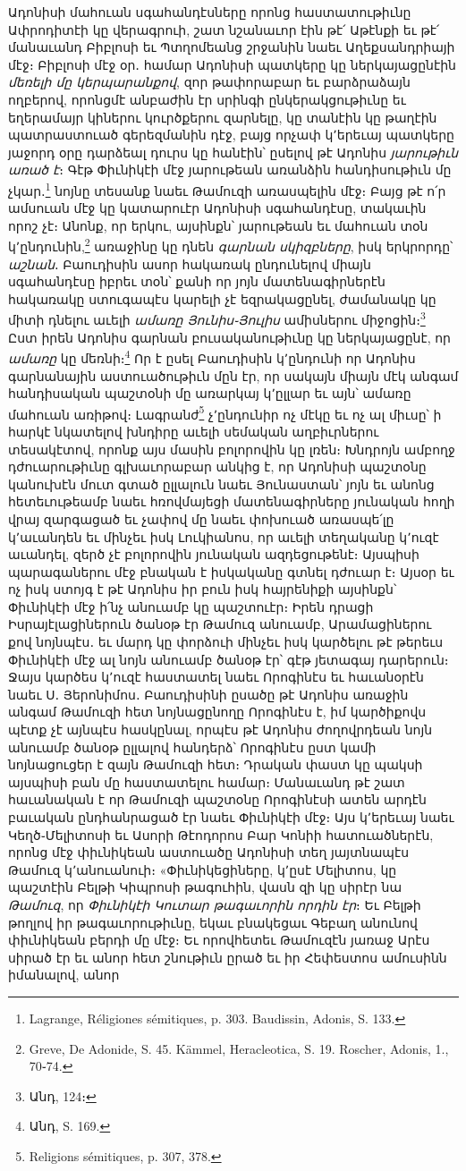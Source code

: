 \documentclass{article}
\begin{document}
{Ադոնիսի մահուան սգահանդէսները որոնց հաստատութիւնը Ափրոդիտէի կը վերագրուի, շատ նշանաւոր էին թէ՛ Աթէնքի եւ թէ՛ մանաւանդ Բիբլոսի եւ Պտղոմեանց շրջանին նաեւ Աղեքսանդրիայի մէջ։ Բիբլոսի մէջ օր․ համար Ադոնիսի պատկերը կը ներկայացընէին \emph{մեռելի մը կերպարանքով}, զոր թափորաբար եւ բարձրաձայն ողբերով, որոնցմէ անբաժին էր սրինգի ընկերակցութիւնը եւ եղերամայր կիներու կուրծքերու զարնելը, կը տանէին կը թաղէին պատրաստուած գերեզմանին դէջ, բայց որչափ կ՚երեւայ պատկերը յաջորդ օրը դարձեալ դուրս կը հանէին՝ ըսելով թէ Ադոնիս \emph{յարութիւն առած է}։ Գէթ Փիւնիկէի մէջ յարութեան առանձին հանդիսութիւն մը չկար․\footnote{Lagrange, Réligiones sémitiques, p. 303. Baudissin, Adonis, S. 133.} նոյնը տեսանք նաեւ Թամուզի առասպելին մէջ։ Բայց թէ ո՛ր ամսուան մէջ կը կատարուէր Ադոնիսի սգահանդէսը, տակաւին որոշ չէ։ Անոնք, որ երկու, այսինքն՝ յարութեան եւ մահուան տօն կ՚ընդունին,\footnote{Greve, De Adonide, S. 45. Kämmel, Heracleotica, S. 19. Roscher, Adonis, 1., 70֊74.} առաջինը կը դնեն \emph{գարնան սկիզբները}, իսկ երկրորդը՝ \emph{աշնան}․ Բաուդիսին ասոր հակառակ ընդունելով միայն սգահանդէսը իբրեւ տօն՝ քանի որ յոյն մատենագիրներէն հակառակը ստուգապէս կարելի չէ եզրակացընել, ժամանակը կը միտի դնելու աւելի \emph{ամառը Յունիս֊Յուլիս} ամիսներու միջոցին։\footnote{Անդ, 124։} Ըստ իրեն Ադոնիս գարնան բուսականութիւնը կը ներկայացընէ, որ \emph{ամառը} կը մեռնի։\footnote{Անդ, S. 169.} Որ է ըսել Բաուդիսին կ՚ընդունի որ Ադոնիս գարնանային աստուածութիւն մըն էր, որ սակայն միայն մէկ անգամ հանդիսական պաշտօնի մը առարկայ կ՚ըլլար եւ այն՝ ամառը մահուան առիթով։ Լագրանժ\footnote{Religions sémitiques, p. 307, 378.} չ՚ընդունիր ոչ մէկը եւ ոչ ալ միւսը՝ ի հարկէ նկատելով խնդիրը աւելի սեմական աղբիւրներու տեսակէտով, որոնք այս մասին բոլորովին կը լռեն։ Խնդրոյն ամբողջ դժուարութիւնը գլխաւորաբար անկից է, որ Ադոնիսի պաշտօնը կանուխէն մուտ գտած ըլլալուն նաեւ Յունաստան՝ յոյն եւ անոնց հետեւութեամբ նաեւ հռովմայեցի մատենագիրները յունական հողի վրայ զարգացած եւ չափով մը նաեւ փոխուած առասպե՛լը կ՚աւանդեն եւ մինչեւ իսկ Լուկիանոս, որ աւելի տեղականը կ՚ուզէ աւանդել, զերծ չէ բոլորովին յունական ազդեցութենէ։ Այսպիսի պարագաներու մէջ բնական է իսկականը գտնել դժուար է։ Այսօր եւ ոչ իսկ ստոյգ է թէ Ադոնիս իր բուն իսկ հայրենիքի այսինքն՝ Փիւնիկէի մէջ ի՛նչ անուամբ կը պաշտուէր։ Իրեն դրացի Իսրայէլացիներուն ծանօթ էր Թամուզ անուամբ, Արամացիներու քով նոյնպէս․ եւ մարդ կը փորձուի մինչեւ իսկ կարծելու թէ թերեւս Փիւնիկէի մէջ ալ նոյն անուամբ ծանօթ էր՝ գէթ յետագայ դարերուն։ Ջայս կարծես կ՚ուզէ հաստատել նաեւ Որոգինէս եւ հաւանօրէն նաեւ Ս․ Յերոնիմոս․ Բաուդիսինի ըսածը թէ Ադոնիս առաջին անգամ Թամուզի հետ նոյնացընողը Որոգինէս է, իմ կարծիքովս պէտք չէ այնպէս հասկընալ, որպէս թէ Ադոնիս ժողովրդեան նոյն անուամբ ծանօթ ըլլալով հանդերձ՝ Որոգինէս ըստ կամի նոյնացուցեր է զայն Թամուզի հետ։ Դրական փաստ կը պակսի այսպիսի բան մը հաստատելու համար։ Մանաւանդ թէ շատ հաւանական է որ Թամուզի պաշտօնը Որոգինէսի ատեն արդէն բաւական ընդհանրացած էր նաեւ Փիւնիկէի մէջ։ Այս կ՚երեւայ նաեւ Կեղծ֊Մելիտոսի եւ Ասորի Թէոդորոս Բար Կոնիի հատուածներէն, որոնց մէջ փիւնիկեան աստուածը Ադոնիսի տեղ յայտնապէս Թամուզ կ՚անուանուի։ «Փիւնիկեցիները, կ՚ըսէ Մելիտոս, կը պաշտէին Բելթի Կիպրոսի թագուհին, վասն զի կը սիրէր նա \emph{Թամուզ}, որ \emph{Փիւնիկէի Կուտար թագաւորին որդին էր}։ Եւ Բելթի թողլով իր թագաւորութիւնը, եկաւ բնակեցաւ Գեբաղ անունով փիւնիկեան բերդի մը մէջ։ Եւ որովհետեւ Թամուզէն յառաջ Արէս սիրած էր եւ անոր հետ շնութիւն ըրած եւ իր Հեփեստոս ամուսինն իմանալով, անոր }
\end{document}
